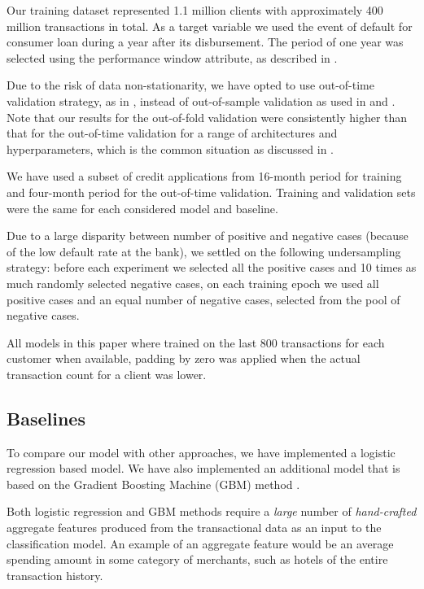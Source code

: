 \documentclass[sigconf]{acmart}
\begin{document}
Our training dataset represented 1.1 million clients with approximately 400 million transactions in total. As a target variable we used the event of default for consumer loan during a year after its disbursement. The period of one year was selected using the performance window attribute, as described in \cite{siddiqi2005credit}.

Due to the risk of data non-stationarity, we have opted to use out-of-time validation strategy, as in \cite{KVAMME2018207}, instead of out-of-sample validation as used in \cite{khandani2010consumer} and \cite{bellotti2013forecasting}. Note that our results for the out-of-fold validation were consistently higher than that for the out-of-time validation for a range of architectures and hyperparameters, which is the common situation as discussed in \cite{glennon2008development}.

We have used a subset of credit applications from 16-month period for training and four-month period for the out-of-time validation. Training and validation sets were the same for each considered model and baseline.

Due to a large disparity between number of positive and negative cases (because of the low default rate at the bank), we settled on the following undersampling strategy: before each experiment we selected all the positive cases and 10 times as much randomly selected negative cases, on each training epoch we used all positive cases and an equal number of negative cases, selected from the pool of negative cases.

All models in this paper where trained on the last 800 transactions for each customer when available, padding by zero was applied when the actual transaction count for a client was lower.

\subsection{Baselines}

To compare our model with other approaches, we have implemented a logistic regression based model. We have also implemented an additional model that is based on the Gradient Boosting Machine (GBM) method \cite{friedman2001greedy}.

Both logistic regression and GBM methods require a \textit{large} number of \textit{hand-crafted} aggregate features produced from the transactional data as an input to the classification model. An example of an aggregate feature would be an average spending amount in some category of merchants, such as hotels of the entire transaction history.
\end{document}
